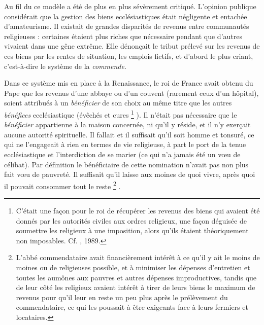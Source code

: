  Au fil du  ce modèle a été de plus en plus sévèrement critiqué. L'opinion publique considérait que la gestion des biens ecclésiastiques était négligente et entachée d'amateurisme. Il existait de grandes disparités de revenus entre communautés religieuses : certaines étaient plus riches que nécessaire pendant que d'autres vivaient dans une gêne extrême. Elle dénonçait le tribut prélevé sur les revenus de ces biens par les rentes de situation, les emplois fictifs, et d'abord le plus criant, c'est-à-dire le système de la \emph{commende}.

 Dans ce système mis en place à la Renaissance, le roi de France avait obtenu du Pape que les revenus d'une abbaye ou d'un couvent (rarement ceux d'un hôpital), soient attribués à un \emph{bénéficier} de son choix au même titre que les autres \emph{bénéfices} ecclésiastique (évêchés et cures%
\footnote{C'était une façon pour le roi de récupérer les revenus des biens qui avaient été donnés par les autorités civiles aux ordres religieux, une façon déguisée de soumettre les religieux à une imposition, alors qu'ils étaient théoriquement non imposables. Cf. , 1989.}%
). Il n'était pas nécessaire que le \emph{bénéficier} appartienne à la maison concernée, ni qu'il y réside, et il n'y exerçait aucune autorité spirituelle. Il fallait et il suffisait qu'il soit homme et tonsuré, ce qui ne l'engageait à rien en termes de vie religieuse, à part le port de la tenue ecclésiastique et l'interdiction de se marier (ce qui n'a jamais été un vœu de célibat). Par définition le bénéficiaire de cette nomination n'avait pas non plus fait vœu de pauvreté. Il suffisait qu'il laisse aux moines de quoi vivre, après quoi il pouvait consommer tout le reste%
\footnote{L'abbé commendataire avait financièrement intérêt à ce qu'il y ait le moins de moines ou de religieuses possible, et à minimiser les dépenses d'entretien et toutes les aumônes aux pauvres et autres dépenses improductives, tandis que de leur côté les religieux avaient intérêt à tirer de leurs biens le maximum de revenus pour qu'il leur en reste un peu plus après le prélèvement du commendataire, ce qui les poussait à être exigeants face à leurs fermiers et locataires.}%
.

